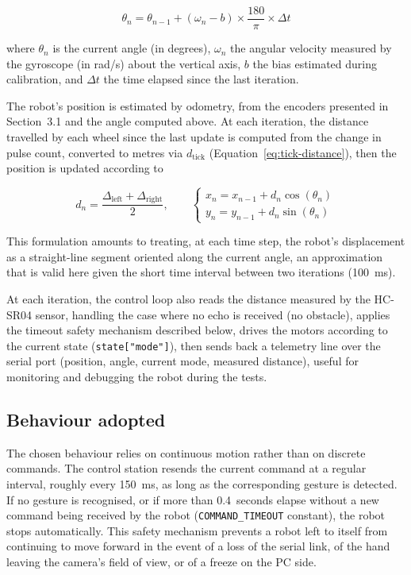 \documentclass[12pt,a4paper]{report}
\begin{document}
	\begin{equation}
		\theta_n = \theta_{n-1} + \left(\omega_n - b\right) \times \frac{180}{\pi} \times \Delta t
		\label{eq:angle-gyro}
	\end{equation}
	
	where $\theta_n$ is the current angle (in degrees), $\omega_n$ the angular velocity measured by the gyroscope (in rad/s) about the vertical axis, $b$ the bias estimated during calibration, and $\Delta t$ the time elapsed since the last iteration.
	
	The robot's position is estimated by odometry, from the encoders presented in Section~3.1 and the angle computed above. At each iteration, the distance travelled by each wheel since the last update is computed from the change in pulse count, converted to metres via $d_{\text{tick}}$ (Equation~\ref{eq:tick-distance}), then the position is updated according to
	
	\begin{equation}
		d_n = \frac{\Delta_{\text{left}} + \Delta_{\text{right}}}{2}, \qquad
		\begin{cases}
			x_n = x_{n-1} + d_n \cos(\theta_n) \\
			y_n = y_{n-1} + d_n \sin(\theta_n)
		\end{cases}
		\label{eq:odometrie}
	\end{equation}
	
	This formulation amounts to treating, at each time step, the robot's displacement as a straight-line segment oriented along the current angle, an approximation that is valid here given the short time interval between two iterations (100~ms).
	
	At each iteration, the control loop also reads the distance measured by the HC-SR04 sensor, handling the case where no echo is received (no obstacle), applies the timeout safety mechanism described below, drives the motors according to the current state (\texttt{state["mode"]}), then sends back a telemetry line over the serial port (position, angle, current mode, measured distance), useful for monitoring and debugging the robot during the tests.
	
	\subsection*{Behaviour adopted}
	
	The chosen behaviour relies on continuous motion rather than on discrete commands. The control station resends the current command at a regular interval, roughly every 150~ms, as long as the corresponding gesture is detected. If no gesture is recognised, or if more than 0.4~seconds elapse without a new command being received by the robot (\texttt{COMMAND\_TIMEOUT} constant), the robot stops automatically. This safety mechanism prevents a robot left to itself from continuing to move forward in the event of a loss of the serial link, of the hand leaving the camera's field of view, or of a freeze on the PC side.
	
\end{document}
